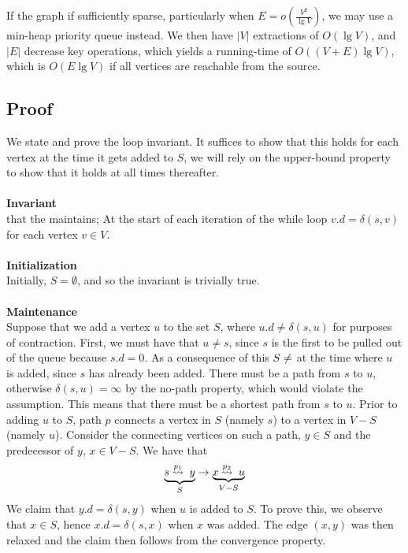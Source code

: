 If the graph if sufficiently sparse, particularly when
$E = o(\frac{V^2}{\lg V})$, we may use a min-heap priority queue instead. We
then have $|V|$ extractions of $O(\lg V)$, and $|E|$ decrease key operations,
which yields a running-time of $O((V+E)\lg V)$, which is $O(E \lg V)$ if all
vertices are reachable from the source.

\newpage
\subsection{Proof}
We state and prove the loop invariant. It suffices to show that this holds for
each vertex at the time it gets added to $S$, we will rely on the upper-bound
property to show that it holds at all times thereafter.
\\\\
\noindent \textbf{Invariant} \\
that the maintains; At the start of each iteration of the while loop
$v.d = \delta(s, v)$ for each vertex $v \in V$.
\\\\
\noindent \textbf{Initialization} \\
Initially, $S = \emptyset$, and so the invariant is trivially true.
\\\\
\noindent \textbf{Maintenance} \\
Suppose that we add a vertex $u$ to the set $S$, where $u.d \neq \delta(s, u)$
for purposes of contraction. First, we must have that $u \neq s$, since $s$ is
the first to be pulled out of the queue because $s.d = 0$. As a consequence of
this $S \neq \empty$ at the time where $u$ is added, since $s$ has already
been added. There must be a path from $s$ to $u$, otherwise $\delta(s, u) =
\infty$ by the no-path property, which would violate the assumption. This
means that there must be a shortest path from $s$ to $u$. Prior to adding $u$
to $S$, path $p$ connects a vertex in $S$ (namely $s$) to a vertex in $V - S$
(namely $u$). Consider the connecting vertices on such a path, $y \in S$ and
the predecessor of $y$, $x \in V - S$. We have that
\begin{align}
	\underbrace{s \buildrel{p_1}\over\leadsto\; y}_{S}
	\rightarrow
	\underbrace{x \buildrel{p_2}\over\leadsto\; u}_{V - S} \nonumber
\end{align}
We claim that $y.d = \delta(s, y)$ when $u$ is added to $S$. To prove this, we
observe that $x \in S$, hence $x.d = \delta(s, x)$ when $x$ was added. The
edge $(x, y)$ was then relaxed and the claim then follows from the convergence
property.

